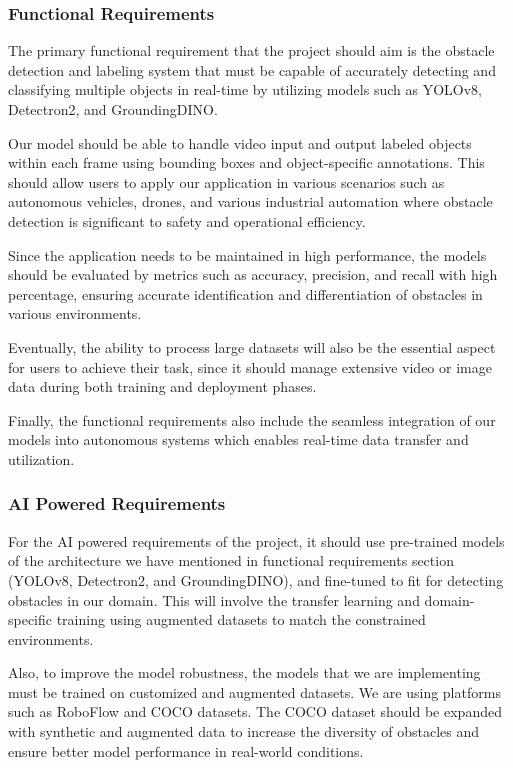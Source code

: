 \documentclass[stu,12pt,floatsintext]{apa7}
\begin{document}
\subsubsection{Functional Requirements}

The primary functional requirement that the project should aim is the obstacle detection and labeling system that must be capable of accurately detecting and classifying multiple objects in real-time by utilizing models such as YOLOv8, Detectron2, and GroundingDINO.

Our model should be able to handle video input and output labeled objects within each frame using bounding boxes and object-specific annotations. This should allow users to apply our application in various scenarios such as autonomous vehicles, drones, and various industrial automation where obstacle detection is significant to safety and operational efficiency. 

Since the application needs to be maintained in high performance, the models should be evaluated by metrics such as accuracy, precision, and recall with high percentage, ensuring accurate identification and differentiation of obstacles in various environments. 

Eventually, the ability to process large datasets will also be the essential aspect for users to achieve their task, since it should manage extensive video or image data during both training and deployment phases. 

Finally, the functional requirements also include the seamless integration of our models into autonomous systems which enables real-time data transfer and utilization. 

\subsubsection{AI Powered Requirements}

For the AI powered requirements of the project, it should use pre-trained models of the architecture we have mentioned in functional requirements section (YOLOv8, Detectron2, and GroundingDINO), and fine-tuned to fit for detecting obstacles in our domain. This will involve the transfer learning and domain-specific training using augmented datasets to match the constrained environments. 

Also, to improve the model robustness, the models that we are implementing must be trained on customized and augmented datasets. We are using platforms such as RoboFlow and COCO datasets. The COCO dataset should be expanded with synthetic and augmented data to increase the diversity of obstacles and ensure better model performance in real-world conditions. 
\end{document}

